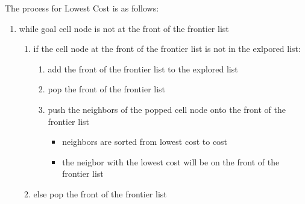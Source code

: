\documentclass[12pt]{article}
\begin{document}
	The process for Lowest Cost is as follows:
	\begin{enumerate}
		\item while goal cell node is not at the front of the frontier list
		\begin{enumerate}
			\item if the cell node at the front of the frontier list is not in the exlpored list:
				\begin{enumerate}
					\item add the front of the frontier list to the explored list
					\item pop the front of the frontier list
					\item push the neighbors of the popped cell node onto the front of the frontier list
					\begin{itemize}
						\item neighbors are sorted from lowest cost to  cost
						\item the neigbor with the lowest cost will be on the front of the frontier list
					\end{itemize}
				\end{enumerate}
			\item else pop the front of the frontier list
		\end{enumerate}
	\end{enumerate}
\end{document}
